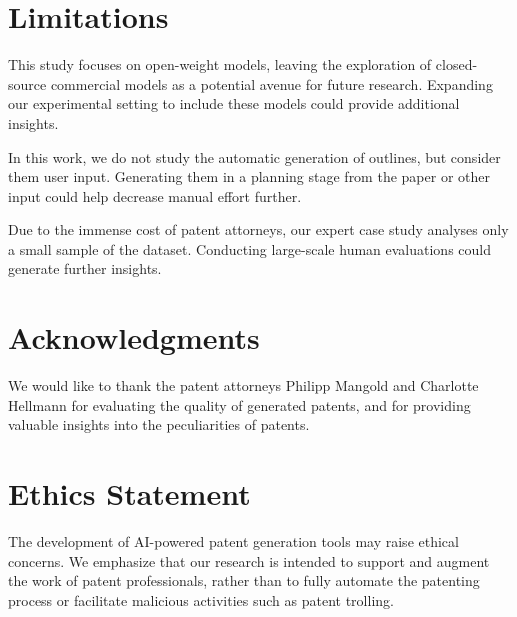 \section*{Limitations}

This study focuses on open-weight models, leaving the exploration of closed-source commercial models as a potential avenue for future research. 
Expanding our experimental setting to include these models could provide additional insights.

In this work, we do not study the automatic generation of outlines, but consider them user input.
Generating them in a planning stage from the paper or other input could help decrease manual effort further.

Due to the immense cost of patent attorneys, our expert case study analyses only a small sample of the dataset.
Conducting large-scale human evaluations could generate further insights.

\section*{Acknowledgments}

We would like to thank the patent attorneys Philipp Mangold and Charlotte Hellmann for evaluating the quality of generated patents, and for providing valuable insights into the peculiarities of patents.

\section*{Ethics Statement}

The development of AI-powered patent generation tools may raise ethical concerns. 
We emphasize that our research is intended to support and augment the work of patent professionals, rather than to fully automate the patenting process or facilitate malicious activities such as patent trolling.
